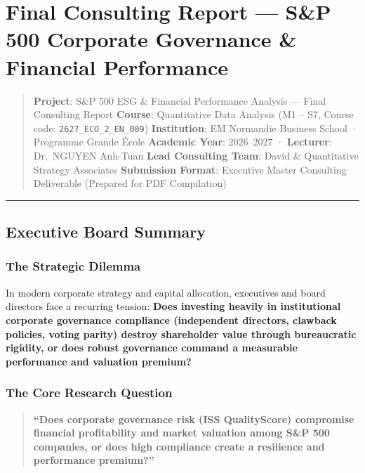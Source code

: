 \documentclass[
]{article}
\author{}
\date{}
\begin{document}
\section{Final Consulting Report --- S\&P 500 Corporate Governance \&
Financial
Performance}\label{final-consulting-report-sp-500-corporate-governance-financial-performance}

\begin{quote}
\textbf{Project}: S\&P 500 ESG \& Financial Performance Analysis ---
Final Consulting Report \textbf{Course}: Quantitative Data Analysis (M1
-- S7, Course code: \texttt{2627\_ECO\_2\_EN\_009})
\textbf{Institution}: EM Normandie Business School · Programme Grande
École \textbf{Academic Year}: 2026--2027 · \textbf{Lecturer}: Dr.~NGUYEN
Anh-Tuan \textbf{Lead Consulting Team}: David \& Quantitative Strategy
Associates \textbf{Submission Format}: Executive Master Consulting
Deliverable (Prepared for PDF Compilation)
\end{quote}

\begin{center}\rule{0.5\linewidth}{0.5pt}\end{center}

\subsection{Executive Board Summary}\label{executive-board-summary}

\subsubsection{The Strategic Dilemma}\label{the-strategic-dilemma}

In modern corporate strategy and capital allocation, executives and
board directors face a recurring tension: \textbf{Does investing heavily
in institutional corporate governance compliance (independent directors,
clawback policies, voting parity) destroy shareholder value through
bureaucratic rigidity, or does robust governance command a measurable
performance and valuation premium?}

\subsubsection{The Core Research
Question}\label{the-core-research-question}

\begin{quote}
\textbf{``Does corporate governance risk (ISS QualityScore) compromise
financial profitability and market valuation among S\&P 500 companies,
or does high compliance create a resilience and performance premium?''}
\end{quote}
\end{document}
